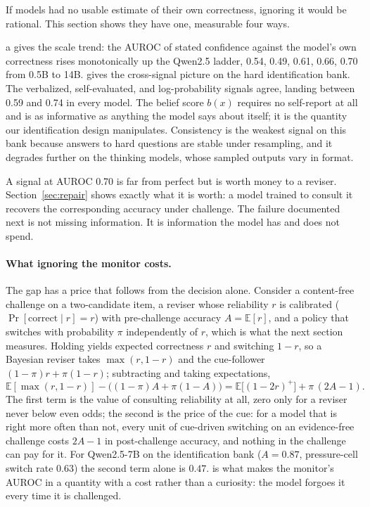 \documentclass{article}
\begin{document}
If models had no usable estimate of their own correctness, ignoring it would be rational. This section shows they have one, measurable four ways.

a gives the scale trend: the AUROC of stated confidence against the model's own correctness rises monotonically up the Qwen2.5 ladder, 0.54, 0.49, 0.61, 0.66, 0.70 from 0.5B to 14B.  gives the cross-signal picture on the hard identification bank. The verbalized, self-evaluated, and log-probability signals agree, landing between 0.59 and 0.74 in every model. The belief score $b(x)$ requires no self-report at all and is as informative as anything the model says about itself; it is the quantity our identification design manipulates. Consistency is the weakest signal on this bank because answers to hard questions are stable under resampling, and it degrades further on the thinking models, whose sampled outputs vary in format.

A signal at AUROC 0.70 is far from perfect but is worth money to a reviser. Section~\ref{sec:repair} shows exactly what it is worth: a model trained to consult it recovers the corresponding accuracy under challenge. The failure documented next is not missing information. It is information the model has and does not spend.

\paragraph{What ignoring the monitor costs.} The gap has a price that follows from the decision alone. Consider a content-free challenge on a two-candidate item, a reviser whose reliability $r$ is calibrated ($\Pr[\text{correct}\mid r]=r$) with pre-challenge accuracy $A=\mathbb{E}[r]$, and a policy that switches with probability $\pi$ independently of $r$, which is what the next section measures. Holding yields expected correctness $r$ and switching $1-r$, so a Bayesian reviser takes $\max(r,1-r)$ and the cue-follower $(1-\pi)r+\pi(1-r)$; subtracting and taking expectations,
\begin{equation}
\mathbb{E}[\max(r,1-r)]-\big((1-\pi)A+\pi(1-A)\big)=\mathbb{E}\big[(1-2r)^{+}\big]+\pi\,(2A-1).
\label{eq:price}
\end{equation}
The first term is the value of consulting reliability at all, zero only for a reviser never below even odds; the second is the price of the cue: for a model that is right more often than not, every unit of cue-driven switching on an evidence-free challenge costs $2A-1$ in post-challenge accuracy, and nothing in the challenge can pay for it. For Qwen2.5-7B on the identification bank ($A=0.87$, pressure-cell switch rate $0.63$) the second term alone is $0.47$.  is what makes the monitor's AUROC in  a quantity with a cost rather than a curiosity: the model forgoes it every time it is challenged.
\end{document}

